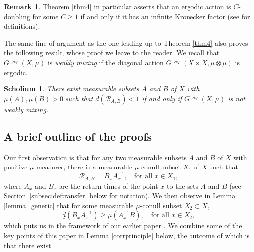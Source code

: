 \documentclass[10pt]{amsart}
\let\mathcal\mathscr
\newcommand{\cR}{\mathcal{R}}
\let\acts\curvearrowright
\theoremstyle{plain}
\newtheorem{scholium}[theorem]{Scholium}
\theoremstyle{definition}
\newtheorem{remark}[theorem]{Remark}
\begin{document}
\begin{remark}
Theorem \ref{thm4} in particular asserts that an ergodic action is $C$\nobreakdash-doubling for some $C \geq 1$ if and only if it has an infinite Kronecker
factor (see \eg \cite{BF} for definitions).
\end{remark}

The same line of argument as the one leading up to Theorem \ref{thm4} also proves the following result, whose proof we leave to the reader.
We recall that $G \acts (X,\mu)$ is \emph{weakly mixing} if the diagonal action $G \acts (X \times X,\mu \otimes \mu)$ is ergodic.

\begin{scholium}
There exist measurable subsets $A$ and $B$ of $X$ with $\mu(A),\mu(B) > 0$ such that $\underline{d}(\cR_{A,B}) < 1$ if and only if $G \acts (X,\mu)$ is \emph{not}
weakly mixing.
\end{scholium}

\subsection{A brief outline of the proofs}

Our first observation is that for any two measurable subsets $A$ and $B$ of $X$ with positive $\mu$-measures, there is a measurable
$\mu$-conull subset $X_1$ of $X$ such that
\[
\cR_{A,B} = B_x A_x^{-1}, \quad \textrm{for all $x \in X_1$},
\]
where $A_x$ and $B_x$ are the return times of the point $x$ to the sets $A$ and $B$ (see Section~\ref{subsec:deftransfer} below for notation).
We then observe in Lemma \ref{lemma_generic} that for some measurable $\mu$-conull subset $X_2 \subset X$,
\[
\underline{d}(B_xA_x^{-1}) \geq \mu(A_x^{-1}B), \quad \textrm{for all $x \in X_2$},
\]
which puts us in the framework of our earlier paper \cite{BF}. We combine some of the key points of this paper in Lemma \ref{corrprinciple}
below, the outcome of which is that there exist
\end{document}
